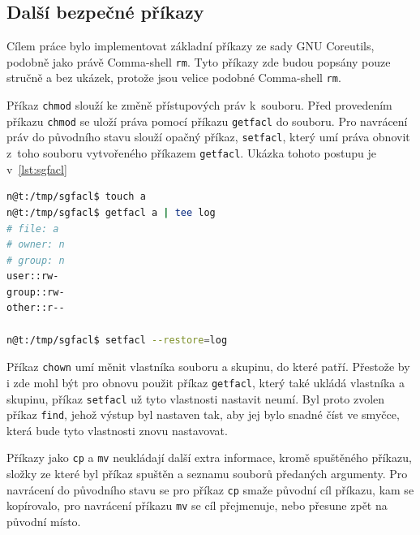 \documentclass[thesis=M,czech]{FITthesis}[2012/06/26]
\begin{document}
\subsection{Další bezpečné příkazy}

Cílem práce bylo implementovat základní příkazy ze sady GNU Coreutils, podobně jako právě Comma-shell \texttt{rm}. Tyto příkazy zde budou popsány pouze stručně a bez ukázek, protože jsou velice podobné Comma-shell \texttt{rm}.

Příkaz \texttt{chmod} slouží ke změně přístupových práv k~souboru. Před provedením příkazu \texttt{chmod} se uloží práva pomocí příkazu \texttt{getfacl} do souboru. Pro navrácení práv do původního stavu slouží opačný příkaz, \texttt{setfacl}, který umí práva obnovit z~toho souboru vytvořeného příkazem \texttt{getfacl}. Ukázka tohoto postupu je v~\ref{lst:sgfacl}

\noindent
\begin{minipage}{\linewidth}
\begin{lstlisting}[language=bash, caption={Kombinace příkazů \texttt{getfacl} a \texttt{setfacl}}, label={lst:sgfacl}]
n@t:/tmp/sgfacl$ touch a
n@t:/tmp/sgfacl$ getfacl a | tee log
# file: a
# owner: n
# group: n
user::rw-
group::rw-
other::r--

n@t:/tmp/sgfacl$ setfacl --restore=log
\end{lstlisting}
\end{minipage}

Příkaz \texttt{chown} umí měnit vlastníka souboru a skupinu, do které patří. Přestože by i zde mohl být pro obnovu použit příkaz \texttt{getfacl}, který také ukládá vlastníka a skupinu, příkaz \texttt{setfacl} už tyto vlastnosti nastavit neumí. Byl proto zvolen příkaz \texttt{find}, jehož výstup byl nastaven tak, aby jej bylo snadné číst ve smyčce, která bude tyto vlastnosti znovu nastavovat. 


Příkazy jako \texttt{cp} a \texttt{mv} neukládají další extra informace, kromě spuštěného příkazu, složky ze které byl příkaz spuštěn a seznamu souborů předaných argumenty. Pro navrácení do původního stavu se pro příkaz \texttt{cp} smaže původní cíl příkazu, kam se kopírovalo, pro navrácení příkazu \texttt{mv} se cíl přejmenuje, nebo přesune zpět na původní místo.



\end{document}
